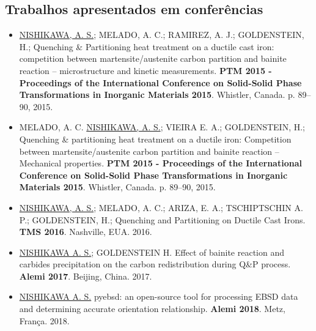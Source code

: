 \subsection*{Trabalhos apresentados em conferências}

\begin{itemize}
	\item \underline{NISHIKAWA, A. S.}; MELADO, A. C.; RAMIREZ, A. J.; GOLDENSTEIN, H.; Quenching \& Partitioning heat treatment on a ductile cast iron: competition between martensite/austenite carbon partition and bainite reaction -- microstructure and kinetic measurements. \textbf{PTM 2015 - Proceedings of the International Conference on Solid-Solid Phase Transformations in Inorganic Materials 2015}. Whistler, Canada. p. 89–90, 2015.

	\item MELADO, A. C. \underline{NISHIKAWA, A. S.}; VIEIRA E. A.; GOLDENSTEIN, H.; Quenching \& partitioning heat treatment on a ductile iron: Competition between martensite/austenite carbon partition and bainite reaction -- Mechanical properties. \textbf{PTM 2015 - Proceedings of the International Conference on Solid-Solid Phase Transformations in Inorganic Materials 2015}. Whistler, Canada. p. 89–90, 2015.

	\item \underline{NISHIKAWA, A. S.}; MELADO, A. C.; ARIZA, E. A.; TSCHIPTSCHIN A. P.; GOLDENSTEIN, H.; Quenching and Partitioning on Ductile Cast Irons. \textbf{TMS 2016}. Nashville, EUA. 2016.

	\item \underline{NISHIKAWA A. S.}; GOLDENSTEIN H. Effect of bainite reaction and carbides precipitation on the carbon redistribution during Q\&P process. \textbf{Alemi 2017}. Beijing, China. 2017.

	\item \underline{NISHIKAWA A. S.} pyebsd: an open-source tool for processing EBSD data and determining accurate orientation relationship. \textbf{Alemi 2018}. Metz, França. 2018.
\end{itemize}